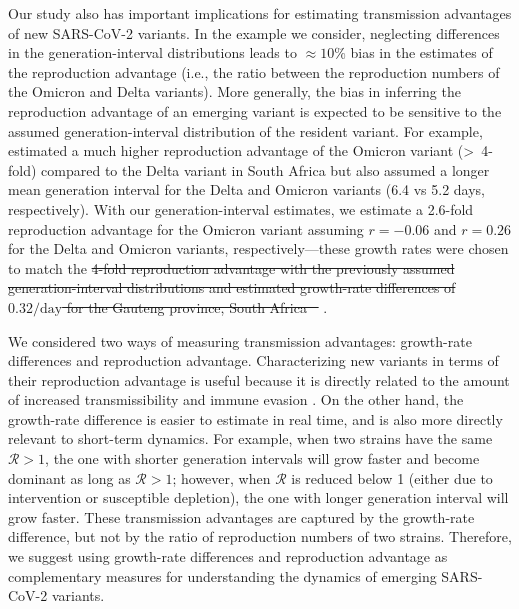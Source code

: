 \documentclass[12pt]{article}
\newcommand{\RR}{\ensuremath{{\mathcal R}}\xspace}
\providecommand{\DIFaddtex}[1]{{\protect\color{blue}\uwave{#1}}} %
\providecommand{\DIFdeltex}[1]{{\protect\color{red}\sout{#1}}}                      %
\providecommand{\DIFaddbegin}{} %
\providecommand{\DIFaddend}{} %
\providecommand{\DIFdelbegin}{} %
\providecommand{\DIFdelend}{} %
\providecommand{\DIFadd}[1]{\texorpdfstring{\DIFaddtex{#1}}{#1}} %
\providecommand{\DIFdel}[1]{\texorpdfstring{\DIFdeltex{#1}}{}} %
\newcommand{\DIFscaledelfig}{0.5}
\newlength{\DIFdelgraphicswidth} %
\newlength{\DIFdelgraphicsheight} %
\newcommand{\DIFaddincludegraphics}[2][]{{\color{blue}\fbox{\DIFOincludegraphics[#1]{#2}}}} %
\newcommand{\DIFdelincludegraphics}[2][]{%
\sbox{\DIFdelgraphicsbox}{\DIFOincludegraphics[#1]{#2}}%
\settoboxwidth{\DIFdelgraphicswidth}{\DIFdelgraphicsbox} %
\settoboxtotalheight{\DIFdelgraphicsheight}{\DIFdelgraphicsbox} %
\scalebox{\DIFscaledelfig}{%
\parbox[b]{\DIFdelgraphicswidth}{\usebox{\DIFdelgraphicsbox}\\[-\baselineskip] \rule{\DIFdelgraphicswidth}{0em}}\llap{\resizebox{\DIFdelgraphicswidth}{\DIFdelgraphicsheight}{%
\setlength{\unitlength}{\DIFdelgraphicswidth}%
\begin{picture}(1,1)%
\thicklines\linethickness{2pt} %
{\color[rgb]{1,0,0}\put(0,0){\framebox(1,1){}}}%
{\color[rgb]{1,0,0}\put(0,0){\line( 1,1){1}}}%
{\color[rgb]{1,0,0}\put(0,1){\line(1,-1){1}}}%
\end{picture}%
}\hspace*{3pt}}} %
} %
\DeclareRobustCommand{\DIFaddbegin}{\DIFOaddbegin \let\includegraphics\DIFaddincludegraphics} %
\DeclareRobustCommand{\DIFaddend}{\DIFOaddend \let\includegraphics\DIFOincludegraphics} %
\DeclareRobustCommand{\DIFdelbegin}{\DIFOdelbegin \let\includegraphics\DIFdelincludegraphics} %
\DeclareRobustCommand{\DIFdelend}{\DIFOaddend \let\includegraphics\DIFOincludegraphics} %
\begin{document}
Our study also has important implications for estimating transmission advantages of new SARS-CoV-2 variants.
In the example we consider, neglecting differences in the generation-interval distributions leads to $\approx 10\%$ bias in the estimates of the reproduction advantage (i.e., the ratio between the reproduction numbers of the Omicron and Delta variants).
More generally, the bias in inferring the reproduction advantage of an emerging variant is expected to be sensitive to the assumed generation-interval distribution of the resident variant.
For example, \cite{pearson2021bounding} estimated a much higher reproduction advantage of the Omicron variant (\textgreater\ 4-fold) compared to the Delta variant in South Africa but also assumed a longer mean generation interval for the Delta and Omicron variants (6.4 vs 5.2 days, respectively).
With our generation-interval estimates, we estimate a 2.6-fold reproduction advantage for the Omicron variant assuming $r=-0.06$ and $r=0.26$ for the Delta and Omicron variants, respectively---these growth rates were chosen to match the \DIFdelbegin \DIFdel{4-fold reproduction advantage with the previously assumed generation-interval distributions and estimated growth-rate differences of $0.32/\mathrm{day}$ for the Gauteng province, South Africa \mbox{%
\cite{pearson2021bounding}}\hspace{0pt}%
}\DIFdelend \DIFaddbegin \DIFadd{assumptions and results of \mbox{%
\cite{pearson2021bounding} }\hspace{0pt}%
for Gauteng province}\DIFaddend .

We considered two ways of measuring transmission advantages: growth-rate differences and reproduction advantage.
Characterizing new variants in terms of their reproduction advantage is useful because it is directly related to the amount of increased transmissibility and immune evasion \citep{pearson2021bounding}.
On the other hand, the growth-rate difference is easier to estimate in real time, and is also more directly relevant to short-term dynamics. 
For example, when two strains have the same $\RR>1$, the one with shorter generation intervals will grow faster and become dominant as long as $\RR>1$;
however, when $\RR$ is reduced below 1 (either due to intervention or susceptible depletion), the one with longer generation interval will grow faster.
These transmission advantages are captured by the growth-rate difference, but not by the ratio of reproduction numbers of two strains.
Therefore, we suggest using growth-rate differences and reproduction advantage as complementary measures for understanding the dynamics of emerging SARS-CoV-2 variants.
\end{document}
